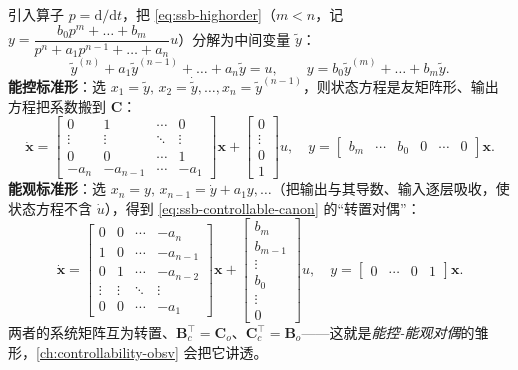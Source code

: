 \begin{derivation}[$m<n$：能控标准形与能观标准形]
\label{der:ssb-canonical}
引入算子 $p=\mathrm{d}/\mathrm{d}t$，把 \cref{eq:ssb-highorder}（$m<n$，记 $y=\dfrac{b_0 p^m+\dots+b_m}{p^n+a_1 p^{n-1}+\dots+a_n}u$）分解为中间变量 $\tilde y$：
\[
  \tilde y^{(n)}+a_1\tilde y^{(n-1)}+\dots+a_n\tilde y=u,\qquad y=b_0\tilde y^{(m)}+\dots+b_m\tilde y.
\]
\textbf{能控标准形}：选 $x_1=\tilde y,\,x_2=\dot{\tilde y},\dots,x_n=\tilde y^{(n-1)}$，则状态方程是友矩阵形、输出方程把系数搬到 $\mathbf{C}$：
\begin{equation}
  \dot{\mathbf{x}}=\begin{bmatrix}0&1&\cdots&0\\ \vdots&\vdots&\ddots&\vdots\\ 0&0&\cdots&1\\ -a_n&-a_{n-1}&\cdots&-a_1\end{bmatrix}\mathbf{x}+\begin{bmatrix}0\\\vdots\\0\\1\end{bmatrix}u,\quad
  y=\begin{bmatrix}b_m&\cdots&b_0&0&\cdots&0\end{bmatrix}\mathbf{x}.
  \label{eq:ssb-controllable-canon}
\end{equation}
\textbf{能观标准形}：选 $x_n=y,\,x_{n-1}=\dot y+a_1 y,\dots$（把输出与其导数、输入逐层吸收，使状态方程不含 $\dot u$），得到 \cref{eq:ssb-controllable-canon} 的“转置对偶”：
\begin{equation}
  \dot{\mathbf{x}}=\begin{bmatrix}0&0&\cdots&-a_n\\ 1&0&\cdots&-a_{n-1}\\ 0&1&\cdots&-a_{n-2}\\ \vdots&\vdots&\ddots&\vdots\\ 0&0&\cdots&-a_1\end{bmatrix}\mathbf{x}+\begin{bmatrix}b_m\\ b_{m-1}\\ \vdots\\ b_0\\ \vdots\\0\end{bmatrix}u,\quad y=\begin{bmatrix}0&\cdots&0&1\end{bmatrix}\mathbf{x}.
  \label{eq:ssb-observable-canon}
\end{equation}
两者的系统矩阵互为转置、$\mathbf{B}_c^\top=\mathbf{C}_o$、$\mathbf{C}_c^\top=\mathbf{B}_o$——这就是\emph{能控-能观对偶}的雏形\cite{zhang2017modern}，\cref{ch:controllability-obsv} 会把它讲透。
\end{derivation}


